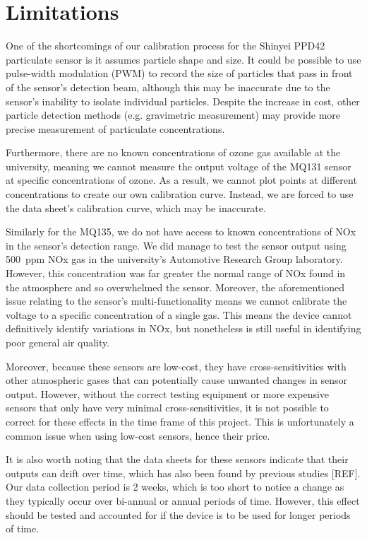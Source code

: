 \documentclass[11pt]{report}
\begin{document}
\section{Limitations}

One of the shortcomings of our calibration process for the Shinyei PPD42 particulate sensor is it assumes particle shape and size. It could be possible to use pulse-width modulation (PWM) to record the size of particles that pass in front of the sensor's detection beam, although this may be inaccurate due to the sensor's inability to isolate individual particles. Despite the increase in cost, other particle detection methods (e.g. gravimetric measurement) may provide more precise measurement of particulate concentrations.

Furthermore, there are no known concentrations of ozone gas available at the university, meaning we cannot measure the output voltage of the MQ131 sensor at specific concentrations of ozone. As a result, we cannot plot points at different concentrations to create our own calibration curve. Instead, we are forced to use the data sheet's calibration curve, which may be inaccurate.

Similarly for the MQ135, we do not have access to known concentrations of NOx in the sensor's detection range. We did manage to test the sensor output using 500~ppm NOx gas in the university's Automotive Research Group laboratory. However, this concentration was far greater the normal range of NOx found in the atmosphere and so overwhelmed the sensor. Moreover, the aforementioned issue relating to the sensor's multi-functionality means we cannot calibrate the voltage to a specific concentration of a single gas. This means the device cannot definitively identify variations in NOx, but nonetheless is still useful in identifying poor general air quality.


Moreover, because these sensors are low-cost, they have cross-sensitivities with other atmospheric gases that can potentially cause unwanted changes in sensor output. However, without the correct testing equipment or more expensive sensors that only have very minimal cross-sensitivities, it is not possible to correct for these effects in the time frame of this project. This is unfortunately a common issue when using low-cost sensors, hence their price.

It is also worth noting that the data sheets for these sensors indicate that their outputs can drift over time, which has also been found by previous studies [REF]. Our data collection period is 2 weeks, which is too short to notice a change as they typically occur over bi-annual or annual periods of time. However, this effect should be tested and accounted for if the device is to be used for longer periods of time.
\end{document}
